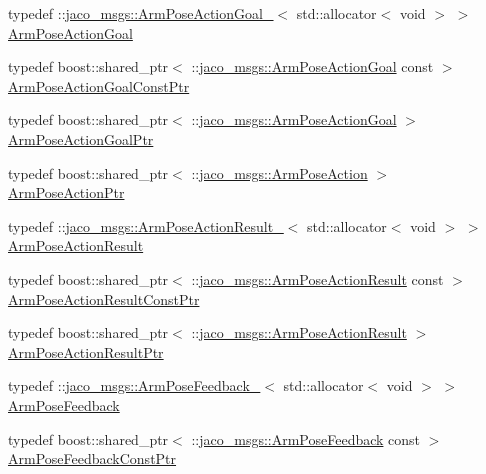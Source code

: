 \begin{DoxyCompactItemize}
\item 
typedef \+::\hyperlink{structjaco__msgs_1_1ArmPoseActionGoal__}{jaco\+\_\+msgs\+::\+Arm\+Pose\+Action\+Goal\+\_\+}$<$ std\+::allocator$<$ void $>$ $>$ \hyperlink{namespacejaco__msgs_a2e83673c25190ff8e4624e814c90a135}{Arm\+Pose\+Action\+Goal}
\item 
typedef boost\+::shared\+\_\+ptr$<$ \+::\hyperlink{namespacejaco__msgs_a2e83673c25190ff8e4624e814c90a135}{jaco\+\_\+msgs\+::\+Arm\+Pose\+Action\+Goal} const  $>$ \hyperlink{namespacejaco__msgs_ad6166efbd8bc4701e9a4b7a5d9722ec3}{Arm\+Pose\+Action\+Goal\+Const\+Ptr}
\item 
typedef boost\+::shared\+\_\+ptr$<$ \+::\hyperlink{namespacejaco__msgs_a2e83673c25190ff8e4624e814c90a135}{jaco\+\_\+msgs\+::\+Arm\+Pose\+Action\+Goal} $>$ \hyperlink{namespacejaco__msgs_a4996cfc2f9b8b8d6c276363b8c735675}{Arm\+Pose\+Action\+Goal\+Ptr}
\item 
typedef boost\+::shared\+\_\+ptr$<$ \+::\hyperlink{namespacejaco__msgs_a4c602e87a73fa73e367226c6d5547ebd}{jaco\+\_\+msgs\+::\+Arm\+Pose\+Action} $>$ \hyperlink{namespacejaco__msgs_afef278ef50dd1a68d06d2b5be897ea34}{Arm\+Pose\+Action\+Ptr}
\item 
typedef \+::\hyperlink{structjaco__msgs_1_1ArmPoseActionResult__}{jaco\+\_\+msgs\+::\+Arm\+Pose\+Action\+Result\+\_\+}$<$ std\+::allocator$<$ void $>$ $>$ \hyperlink{namespacejaco__msgs_aafa68684686d8122bbaaf8f61eef394f}{Arm\+Pose\+Action\+Result}
\item 
typedef boost\+::shared\+\_\+ptr$<$ \+::\hyperlink{namespacejaco__msgs_aafa68684686d8122bbaaf8f61eef394f}{jaco\+\_\+msgs\+::\+Arm\+Pose\+Action\+Result} const  $>$ \hyperlink{namespacejaco__msgs_a474756c244b76ca143f4edf26b50ac4f}{Arm\+Pose\+Action\+Result\+Const\+Ptr}
\item 
typedef boost\+::shared\+\_\+ptr$<$ \+::\hyperlink{namespacejaco__msgs_aafa68684686d8122bbaaf8f61eef394f}{jaco\+\_\+msgs\+::\+Arm\+Pose\+Action\+Result} $>$ \hyperlink{namespacejaco__msgs_ae916708101497e9b3d848df7bc82307c}{Arm\+Pose\+Action\+Result\+Ptr}
\item 
typedef \+::\hyperlink{structjaco__msgs_1_1ArmPoseFeedback__}{jaco\+\_\+msgs\+::\+Arm\+Pose\+Feedback\+\_\+}$<$ std\+::allocator$<$ void $>$ $>$ \hyperlink{namespacejaco__msgs_a0157e0f10c971ac0b7a8f5c9ce836574}{Arm\+Pose\+Feedback}
\item 
typedef boost\+::shared\+\_\+ptr$<$ \+::\hyperlink{namespacejaco__msgs_a0157e0f10c971ac0b7a8f5c9ce836574}{jaco\+\_\+msgs\+::\+Arm\+Pose\+Feedback} const  $>$ \hyperlink{namespacejaco__msgs_a19e2f18483333fe0501cb35b4911cdde}{Arm\+Pose\+Feedback\+Const\+Ptr}

\end{DoxyCompactItemize}
